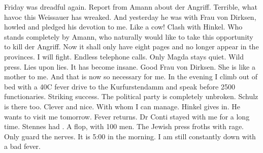 Friday was dreadful again. Report from Amann about der Angriff. Terrible, what havoc this Weissauer has wreaked. And yesterday he was with Frau von Dirksen, howled and pledged his devotion to me. Like a cow! Clash with Hinkel. Who stands completely by Amann, who naturally would like to take this opportunity to kill der Angriff. Now it shall only have eight pages and no longer appear in the provinces. I will fight. Endless telephone calls. Only Magda stays quiet. Wild press. Lies upon lies. It has become insane. Good Frau von Dirksen. She is like a mother to me. And that is now so necessary for me.  In the evening I climb out of bed with a 40C fever drive to the Kurfurstendamm and speak before 2500 functionaries. Striking success. The political party is completely unbroken. Schulz is there too. Clever and nice. With whom I can manage. Hinkel gives in. He wants to visit me tomorrow. Fever returns. Dr Conti stayed with me for a long time. Stennes had . A flop, with 100 men. The Jewish press froths with rage. Only guard the nerves. It is 5:00 in the morning. I am still constantly down with a bad fever.

